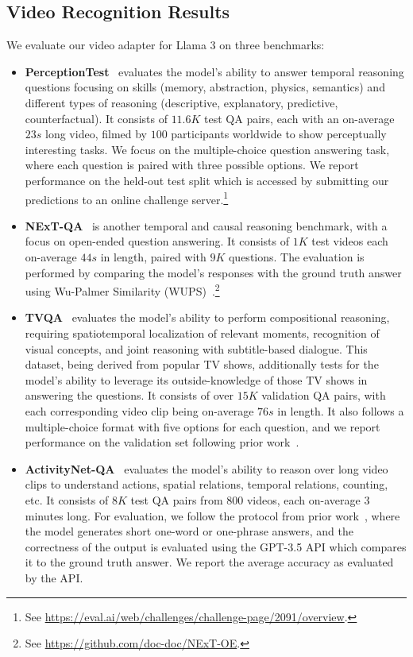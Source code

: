 \subsection{Video Recognition Results}
\label{section:results_video_recognition}

We evaluate our video adapter for Llama 3 on three benchmarks:
\begin{itemize}
\item \textbf{PerceptionTest}~\citep{patraucean2023perception} evaluates the model's ability to answer temporal reasoning questions focusing on skills (memory, abstraction, physics, semantics) and different types of reasoning (descriptive, explanatory, predictive, counterfactual). It consists of $11.6K$ test QA pairs, each with an on-average $23s$ long video, filmed by $100$ participants worldwide to show perceptually interesting tasks. We focus on the multiple-choice question answering task, where each question is paired with three possible options. We report performance on the held-out test split which is accessed by submitting our predictions to an online challenge server.\footnote{See \url{https://eval.ai/web/challenges/challenge-page/2091/overview}.}

\item \textbf{NExT-QA}~\citep{xiao2021next} is another temporal and causal reasoning benchmark, with a focus on open-ended question answering.
It consists of $1K$ test videos each on-average $44s$ in length, paired with $9K$ questions. The evaluation is performed by comparing the model's responses with the ground truth answer using Wu-Palmer Similarity (WUPS)~\citep{wu1994verb}.\footnote{See \url{https://github.com/doc-doc/NExT-OE}.}

\item \textbf{TVQA}~\citep{lei2018tvqa} evaluates the model's ability to perform compositional reasoning, requiring spatiotemporal localization of relevant moments, recognition of visual concepts, and joint reasoning with subtitle-based dialogue. This dataset, being derived from popular TV shows, additionally tests for the model's ability to leverage its outside-knowledge of those TV shows in answering the questions. It consists of over $15K$ validation QA pairs, with each corresponding video clip being on-average $76s$ in length. It also follows a multiple-choice format with five options for each question, and we report performance on the validation set following prior work~\citep{openai2023gpt4blog}.

\item \textbf{ActivityNet-QA}~\citep{yu2019activityqa} evaluates the model's ability to reason over long video clips to understand actions, spatial relations, temporal relations, counting, etc. It consists of $8K$ test QA pairs from $800$ videos, each on-average $3$ minutes long. For evaluation, we follow the protocol from prior work~\citep{gemini2023gemini,lin2023video,Maaz2023VideoChatGPT}, where the model generates short one-word or one-phrase answers, and the correctness of the output is evaluated using the GPT-3.5 API which compares it to the ground truth answer. We report the average accuracy as evaluated by the API.
\end{itemize}

